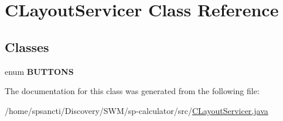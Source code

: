 \hypertarget{class_c_layout_servicer}{}\section{C\+Layout\+Servicer Class Reference}
\label{class_c_layout_servicer}
\subsection*{Classes}
\begin{DoxyCompactItemize}
\item 
enum {\bfseries B\+U\+T\+T\+O\+NS}
\end{DoxyCompactItemize}


The documentation for this class was generated from the following file\+:\begin{DoxyCompactItemize}
\item 
/home/spsancti/\+Discovery/\+S\+W\+M/sp-\/calculator/src/\hyperlink{_c_layout_servicer_8java}{C\+Layout\+Servicer.\+java}\end{DoxyCompactItemize}
